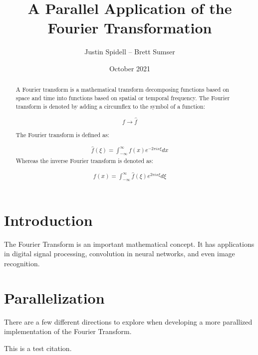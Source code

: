 \documentclass[12pt]{extarticle}
\title{A Parallel Application of the Fourier Transformation}
\author{Justin Spidell -- Brett Sumser}
\date{October 2021}
\begin{document}
 
\maketitle
\newpage
\begin{abstract}

A Fourier transform is a mathematical transform decomposing functions based on space and time into functions based on spatial or temporal frequency. The Fourier transform is denoted by adding a circumflex to the symbol of a function:

\begin{align*}
f \rightarrow \hat{f}
\end{align*}

The Fourier transform is defined as:

\begin{align}
\hat{f} (\xi)= \int^{\infty}_{-\infty}f(x) e^{-2 \pi i x \xi}dx
\end{align}
Whereas the inverse Fourier transform is denoted as:

\begin{align}
{f} (x)= \int^{\infty}_{-\infty}\hat{f}(\xi) e^{2 \pi i x \xi}d\xi
\end{align}

\end{abstract}


\maketitle
\newpage
\section*{Introduction}

    The Fourier Transform is an important mathematical concept. It has applications
    in digital signal processing, convolution in neural networks, and even image recognition.

\maketitle
\newpage
\section*{Parallelization} 
    
    There are a few different directions to explore when developing a more
    parallized implementation of the Fourier Transform.
    
    This is a test citation. \cite{knuth:1984}



\end{document}
